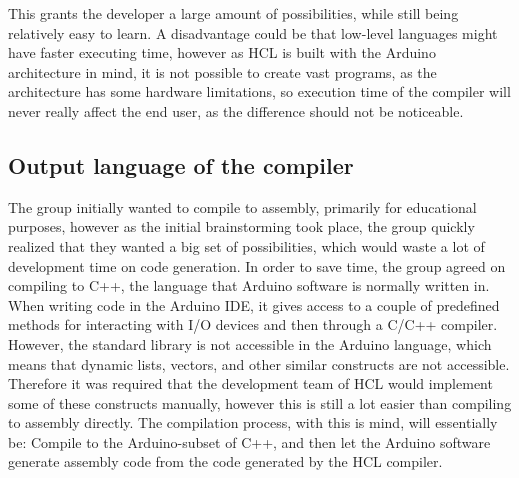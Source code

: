 This grants the developer a large amount of possibilities, while still being relatively easy to learn.
A disadvantage could be that low-level languages might have faster executing time, however as HCL is built with the Arduino architecture in mind, it is not possible to create vast programs, as the architecture has some hardware limitations, so execution time of the compiler will never really affect the end user, as the difference should not be noticeable.

\subsection{Output language of the compiler}
The group initially wanted to compile to assembly, primarily for educational purposes, however as the initial brainstorming took place, the group quickly realized that they wanted a big set of possibilities, which would waste a lot of development time on code generation. 
In order to save time, the group agreed on compiling to C++, the language that Arduino software is normally written in.
When writing code in the Arduino IDE, it gives access to a couple of predefined methods for interacting with I/O devices and then through a C/C++ compiler\cite{ArFAQ}.
However, the standard library is not accessible in the Arduino language, which means that dynamic lists, vectors, and other similar constructs are not accessible.
Therefore it was required that the development team of HCL would implement some of these constructs manually, however this is still a lot easier than compiling to assembly directly. 
The compilation process, with this is mind, will essentially be: Compile to the Arduino-subset of C++, and then let the Arduino software generate assembly code from the code generated by the HCL compiler.
